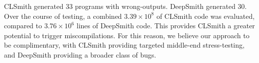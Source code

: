 CLSmith generated 33 programs with wrong-outputs. DeepSmith generated 30. Over the course of testing, a combined $3.39 \times 10^8$ of CLSmith code was evaluated, compared to $3.76 \times 10^6$ lines of DeepSmith code. This provides CLSmith a greater potential to trigger miscompilations. For this reason, we believe our approach to be complimentary, with CLSmith providing targeted middle-end stress-testing, and DeepSmith providing a broader class of bugs.




